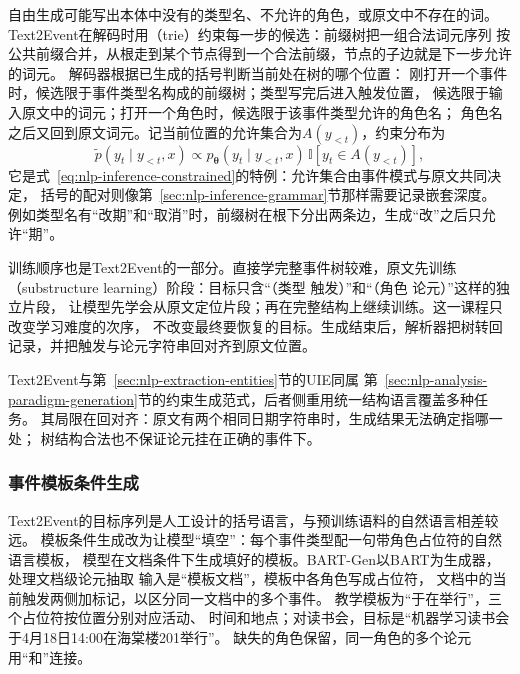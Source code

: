 自由生成可能写出本体中没有的类型名、不允许的角色，或原文中不存在的词。
Text2Event在解码时用（trie）约束每一步的候选：前缀树把一组合法词元序列
按公共前缀合并，从根走到某个节点得到一个合法前缀，节点的子边就是下一步允许的词元。
解码器根据已生成的括号判断当前处在树的哪个位置：
刚打开一个事件时，候选限于事件类型名构成的前缀树；类型写完后进入触发位置，
候选限于输入原文中的词元；打开一个角色时，候选限于该事件类型允许的角色名；
角色名之后又回到原文词元。记当前位置的允许集合为$A(y_{<t})$，约束分布为
\begin{equation}
  \tilde{p}(y_t\mid y_{<t},x)\propto
  p_{\bm{\theta}}(y_t\mid y_{<t},x)\,\mathbb{I}[y_t\in A(y_{<t})],
  \label{eq:nlp-extraction-text2event-mask}
\end{equation}
它是式~\eqref{eq:nlp-inference-constrained}的特例：允许集合由事件模式与原文共同决定，
括号的配对则像第~\ref{sec:nlp-inference-grammar}节那样需要记录嵌套深度。
例如类型名有“改期”和“取消”时，前缀树在根下分出两条边，生成“改”之后只允许“期”。

训练顺序也是Text2Event的一部分。直接学完整事件树较难，原文先训练
（substructure learning）阶段：目标只含“（类型 触发）”和“（角色 论元）”这样的独立片段，
让模型先学会从原文定位片段；再在完整结构上继续训练。这一课程只改变学习难度的次序，
不改变最终要恢复的目标。生成结束后，解析器把树转回记录，并把触发与论元字符串回对齐到原文位置。

Text2Event与第~\ref{sec:nlp-extraction-entities}节的UIE同属
第~\ref{sec:nlp-analysis-paradigm-generation}节的约束生成范式，后者侧重用统一结构语言覆盖多种任务。
其局限在回对齐：原文有两个相同日期字符串时，生成结果无法确定指哪一处；
树结构合法也不保证论元挂在正确的事件下。

\subsubsection{事件模板条件生成}
\label{sec:nlp-extraction-event-template}

Text2Event的目标序列是人工设计的括号语言，与预训练语料的自然语言相差较远。
模板条件生成改为让模型“填空”：每个事件类型配一句带角色占位符的自然语言模板，
模型在文档条件下生成填好的模板。BART-Gen以BART为生成器，处理文档级论元抽取
输入是“模板文档”，模板中各角色写成占位符，
文档中的当前触发两侧加标记，以区分同一文档中的多个事件。
教学模板为“于在举行”，三个占位符按位置分别对应活动、
时间和地点；对读书会，目标是“机器学习读书会于4月18日14:00在海棠楼201举行”。
缺失的角色保留，同一角色的多个论元用“和”连接。

